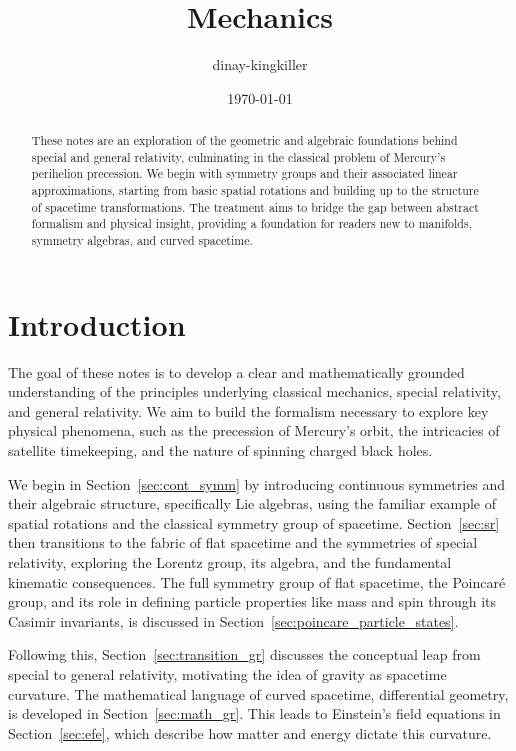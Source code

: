 \documentclass{amsart}
\theoremstyle{definition}
\theoremstyle{remark}
\begin{document}
\title{Mechanics}
\author{dinay-kingkiller}
\date{\today}

\begin{abstract}
  These notes are an exploration of the geometric and algebraic foundations behind special and general relativity, culminating in the classical problem of Mercury’s perihelion precession. We begin with symmetry groups and their associated linear approximations, starting from basic spatial rotations and building up to the structure of spacetime transformations. The treatment aims to bridge the gap between abstract formalism and physical insight, providing a foundation for readers new to manifolds, symmetry algebras, and curved spacetime.
\end{abstract}

\maketitle

\section{Introduction}
\label{sec:intro}

The goal of these notes is to develop a clear and mathematically grounded understanding of the principles underlying classical mechanics, special relativity, and general relativity. We aim to build the formalism necessary to explore key physical phenomena, such as the precession of Mercury's orbit, the intricacies of satellite timekeeping, and the nature of spinning charged black holes.

We begin in Section~\ref{sec:cont_symm} by introducing continuous symmetries and their algebraic structure, specifically Lie algebras, using the familiar example of spatial rotations and the classical symmetry group of spacetime. Section~\ref{sec:sr} then transitions to the fabric of flat spacetime and the symmetries of special relativity, exploring the Lorentz group, its algebra, and the fundamental kinematic consequences. The full symmetry group of flat spacetime, the Poincaré group, and its role in defining particle properties like mass and spin through its Casimir invariants, is discussed in Section~\ref{sec:poincare_particle_states}.

Following this, Section~\ref{sec:transition_gr} discusses the conceptual leap from special to general relativity, motivating the idea of gravity as spacetime curvature. The mathematical language of curved spacetime, differential geometry, is developed in Section~\ref{sec:math_gr}. This leads to Einstein's field equations in Section~\ref{sec:efe}, which describe how matter and energy dictate this curvature.
\end{document}
